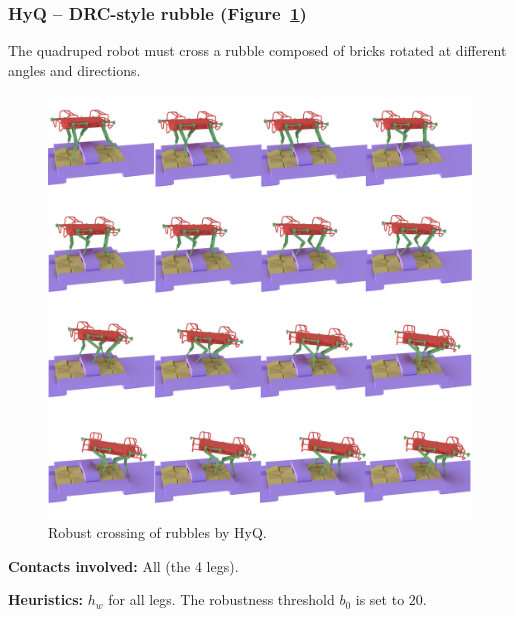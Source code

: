 \subsubsection{HyQ -- DRC-style rubble (Figure~\ref{fig:darpa})}
The quadruped robot must cross a rubble composed of bricks rotated at different angles and directions.

\begin{figure}
  \centering
  \includegraphics[width=1\linewidth]{figures/darpa}
  \caption{
           Robust crossing of rubbles by HyQ. }
		   \label{fig:darpa}
\end{figure}


\noindent\textbf{Contacts involved:} All (the 4 legs).

\noindent\textbf{Heuristics:} $h_w$ for all legs. The robustness threshold $b_0$ is set to $20$.



